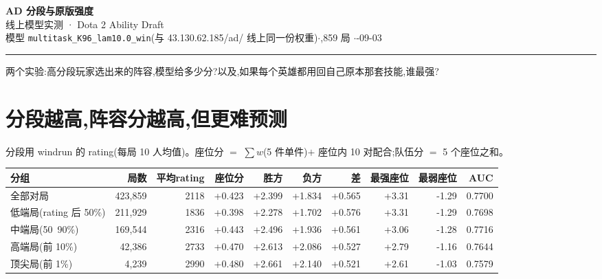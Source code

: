\documentclass[10pt,a4paper]{article}
\newcommand{\pos}[1]{\textcolor{winc}{#1}}\newcommand{\negx}[1]{\textcolor{losec}{#1}}
\begin{document}
\begin{center}
{\Huge\bfseries AD 分段与原版强度}\\[6pt]
{\large\color{mut} 线上模型实测 · Dota 2 Ability Draft}\\[8pt]
{\small\color{mut} 模型 \texttt{multitask\_K96\_lam10.0\_win}(与 43.130.62.185/ad/ 线上同一份权重)\quad$\cdot$,859 局 \quad$\cdot$-09-03}
\end{center}
\vspace{2pt}\noindent\rule{\textwidth}{1pt}\vspace{4pt}

\noindent 两个实验:高分段玩家选出来的阵容,模型给多少分?以及,如果每个英雄都用回自己原本那套技能,谁最强?

\section{分段越高,阵容分越高,但更难预测}
分段用 windrun 的 rating(每局 10 人均值)。座位分 $=$ $\sum w$(5 件单件)$+$ 座位内 10 对配合;队伍分 $=$ 5 个座位之和。

\vspace{4pt}
{\small\begin{tabular}{@{}lrrrrrrrrr@{}}
\toprule
分组 & 局数 & 平均rating & 座位分 & 胜方 & 负方 & 差 & 最强座位 & 最弱座位 & AUC\\
\midrule
全部对局 & 423,859 & 2118 & +0.423 & \pos{+2.399} & \negx{+1.834} & +0.565 & +3.31 & -1.29 & 0.7700 \\
低端局(rating 后 50\%) & 211,929 & 1836 & +0.398 & \pos{+2.278} & \negx{+1.702} & +0.576 & +3.31 & -1.29 & 0.7698 \\
中端局(50~90\%) & 169,544 & 2316 & +0.443 & \pos{+2.496} & \negx{+1.936} & +0.561 & +3.06 & -1.28 & 0.7716 \\
高端局(前 10\%) & 42,386 & 2733 & +0.470 & \pos{+2.613} & \negx{+2.086} & +0.527 & +2.79 & -1.16 & 0.7644 \\
顶尖局(前 1\%) & 4,239 & 2990 & +0.480 & \pos{+2.661} & \negx{+2.140} & +0.521 & +2.61 & -1.03 & 0.7579 \\
\bottomrule
\end{tabular}}
\end{document}
